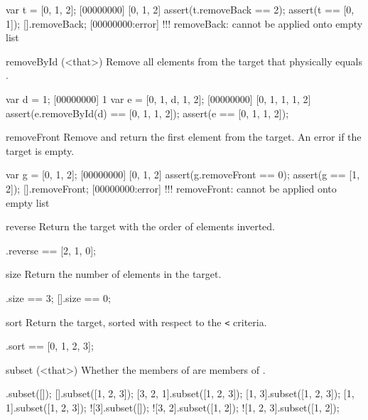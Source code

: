 \begin{urbiscriptapi}
\begin{urbiscript}
var t = [0, 1, 2];
[00000000] [0, 1, 2]
assert(t.removeBack == 2);
assert(t == [0, 1]);
[].removeBack;
[00000000:error] !!! removeBack: cannot be applied onto empty list
\end{urbiscript}

\item[removeById](<that>)
  Remove all elements from the target that physically equals
  .

\begin{urbiscript}
var d = 1;
[00000000] 1
var e = [0, 1, d, 1, 2];
[00000000] [0, 1, 1, 1, 2]
assert(e.removeById(d) == [0, 1, 1, 2]);
assert(e == [0, 1, 1, 2]);
\end{urbiscript}

\item[removeFront]
Remove and return the first element from the target. An error if the
target is empty.

\begin{urbiscript}
var g = [0, 1, 2];
[00000000] [0, 1, 2]
assert(g.removeFront == 0);
assert(g == [1, 2]);
[].removeFront;
[00000000:error] !!! removeFront: cannot be applied onto empty list
\end{urbiscript}

\item[reverse]
Return the target with the order of elements inverted.

\begin{urbiassert}
[0, 1, 2].reverse == [2, 1, 0];
\end{urbiassert}

\item[size]
Return the number of elements in the target.

\begin{urbiassert}
[0, 1, 2].size == 3;
[].size == 0;
\end{urbiassert}

\item[sort]
Return the target, sorted with respect to the \lstinline|<| criteria.

\begin{urbiassert}
[1, 0, 3, 2].sort == [0, 1, 2, 3];
\end{urbiassert}

\item[subset](<that>)
  Whether the members of \this are members of .

\begin{urbiassert}
[].subset([]);
[].subset([1, 2, 3]);
[3, 2, 1].subset([1, 2, 3]);
[1, 3].subset([1, 2, 3]);
[1, 1].subset([1, 2, 3]);
![3].subset([]);
![3, 2].subset([1, 2]);
![1, 2, 3].subset([1, 2]);
\end{urbiassert}


\end{urbiscriptapi}
